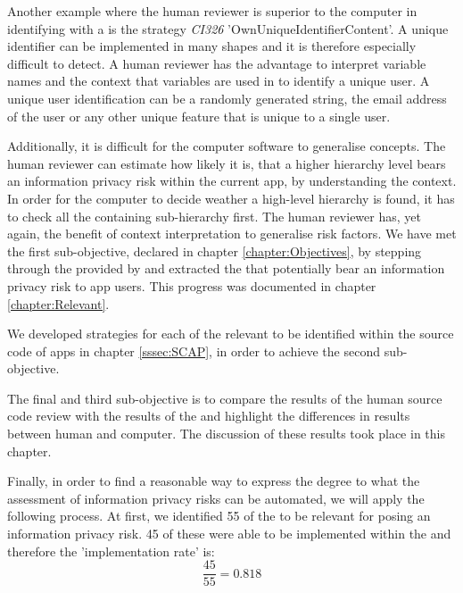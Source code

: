 Another example where the human reviewer is superior to the computer in identifying \ipr with a \sca is the strategy \textit{CI326} 'OwnUniqueIdentifierContent'.
A unique identifier can be implemented in many shapes and it is therefore especially difficult to detect.
A human reviewer has the advantage to interpret variable names and the context that variables are used in to identify a unique user.
A unique user identification can be a randomly generated string, the email address of the user or any other unique feature that is unique to a single user.

Additionally, it is difficult for the computer software to generalise concepts.
The human reviewer can estimate how likely it is, that a higher hierarchy level \ipp bears an information privacy risk within the current app, by understanding the context.
In order for the computer to decide weather a high-level hierarchy is found, it has to check all the containing sub-hierarchy \ipp first.
The human reviewer has, yet again, the benefit of context interpretation to generalise risk factors.
\newline\newline
We have met the first sub-objective, declared in chapter \ref{chapter:Objectives}, by stepping through the \ipp provided by \textcite{Dehling2016} and extracted the \ipp that potentially bear an information privacy risk to \mH app users.
This progress was documented in chapter \ref{chapter:Relevant}.

We developed strategies for each of the relevant \ipp to be identified within the source code of \mH apps in chapter \ref{sssec:SCAP}, in order to achieve the second sub-objective.

The final and third sub-objective is to compare the results of the human source code review with the results of the \aiprat and highlight the differences in results between human and computer.
The discussion of these results took place in this chapter.

Finally, in order to find a reasonable way to express the degree to what the assessment of information privacy risks can be automated, we will apply the following process.
At first, we identified 55 of the \ipp to be relevant for posing an information privacy risk. 
45 of these \ipp were able to be implemented within the \aiprat and therefore the 'implementation rate' is:
\begin{equation}
	\frac{45}{55}=0.818
\end{equation}

